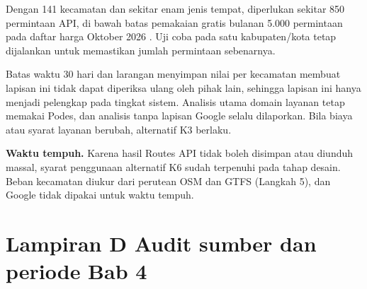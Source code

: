 \documentclass[12pt,a4paper,oneside,openany,indonesian]{report}
\begin{document}
Dengan 141 kecamatan dan sekitar enam jenis tempat, diperlukan sekitar
850 permintaan API, di bawah batas pemakaian
gratis bulanan 5.000 permintaan pada daftar harga Oktober 2026
\parencite{googlemaps2026pricing}. Uji coba pada satu kabupaten/kota
tetap dijalankan untuk memastikan jumlah permintaan sebenarnya.

Batas waktu 30 hari dan larangan menyimpan nilai per kecamatan membuat
lapisan ini tidak dapat diperiksa ulang oleh pihak lain, sehingga
lapisan ini hanya menjadi pelengkap pada tingkat sistem. Analisis
utama domain layanan tetap memakai Podes, dan analisis tanpa lapisan
Google selalu dilaporkan. Bila biaya atau syarat layanan berubah,
alternatif K3 berlaku.

\textbf{Waktu tempuh.} Karena hasil Routes API tidak boleh disimpan atau
diunduh massal, syarat penggunaan alternatif K6 sudah terpenuhi pada tahap desain.
Beban kecamatan diukur dari perutean OSM dan GTFS (Langkah 5), dan
Google tidak dipakai untuk waktu tempuh.


\chapter{Lampiran D Audit sumber dan periode Bab 4}\label{lamp:audit}
\end{document}
